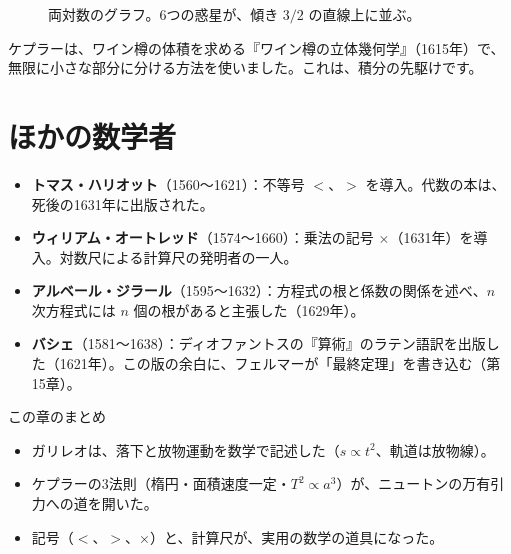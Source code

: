 \documentclass[a4paper,11pt,openany]{ltjsbook}
\begin{document}
\begin{figure}[htbp]
\centering
{}
\caption{両対数のグラフ。6つの惑星が、傾き $3/2$ の直線上に並ぶ。}
\end{figure}

ケプラーは、ワイン樽の体積を求める『ワイン樽の立体幾何学』（1615年）で、無限に小さな部分に分ける方法を使いました。これは、積分の先駆けです。

\section{ほかの数学者}

\begin{itemize}[leftmargin=*]
\item \textbf{トマス・ハリオット}（1560〜1621）：不等号 $<$、$>$ を導入。代数の本は、死後の1631年に出版された。
\item \textbf{ウィリアム・オートレッド}（1574〜1660）：乗法の記号 $\times$（1631年）を導入。対数尺による計算尺の発明者の一人。
\item \textbf{アルベール・ジラール}（1595〜1632）：方程式の根と係数の関係を述べ、$n$ 次方程式には $n$ 個の根があると主張した（1629年）。
\item \textbf{バシェ}（1581〜1638）：ディオファントスの『算術』のラテン語訳を出版した（1621年）。この版の余白に、フェルマーが「最終定理」を書き込む（第15章）。
\end{itemize}

\begin{pointbox}{この章のまとめ}
\begin{itemize}[leftmargin=*]
\item ガリレオは、落下と放物運動を数学で記述した（$s\propto t^2$、軌道は放物線）。
\item ケプラーの3法則（楕円・面積速度一定・$T^2\propto a^3$）が、ニュートンの万有引力への道を開いた。
\item 記号（$<$、$>$、$\times$）と、計算尺が、実用の数学の道具になった。
\end{itemize}
\end{pointbox}
\end{document}
